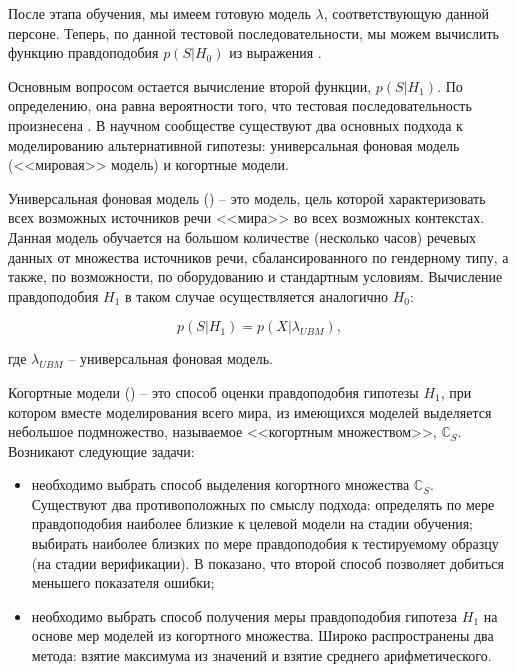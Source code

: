 После этапа обучения, мы имеем готовую модель $\lambda$, соответствующую данной персоне. Теперь, по данной тестовой последовательности, мы можем вычислить функцию правдоподобия $p(S|H_0)$ из выражения .

Основным вопросом остается вычисление второй функции, $p(S|H_1)$. По определению, она равна вероятности того, что тестовая последовательность произнесена . В научном сообществе существуют два основных подхода к моделированию альтернативной гипотезы: универсальная фоновая модель (<<мировая>> модель) и когортные модели.

\label{sec:analytic:ubm}
Универсальная фоновая модель () -- это модель, цель которой характеризовать всех возможных источников речи <<мира>> во всех возможных контекстах. Данная модель обучается на большом количестве (несколько часов) речевых данных от множества источников речи, сбалансированного по гендерному типу, а также, по возможности, по оборудованию и стандартным условиям. Вычисление правдоподобия $H_1$ в таком случае осуществляется аналогично $H_0$:

\begin{equation}
\label{eq:likelihood_ubm}
p(S|H_1) = p(X|\lambda_{UBM}),
\end{equation}

\noindent где $\lambda_{UBM}$ -- универсальная фоновая модель.

Когортные модели () -- это способ оценки правдоподобия гипотезы $H_1$, при котором вместе моделирования всего мира, из имеющихся моделей выделяется небольшое подмножество, называемое <<когортным множеством>>, $\mathbb{C}_S$. Возникают следующие задачи:
\begin{itemize}
\item необходимо выбрать способ выделения когортного множества $\mathbb{C}_S$. Существуют два противоположных по смыслу подхода: определять по мере правдоподобия наиболее близкие к целевой модели на стадии обучения; выбирать наиболее близких по мере правдоподобия к тестируемому образцу (на стадии верификации). В \cite{Kinnunen04cohort} показано, что второй способ позволяет добиться меньшего показателя ошибки;
\item необходимо выбрать способ получения меры правдоподобия гипотеза $H_1$ на основе мер моделей из когортного множества. Широко распространены два метода: взятие максимума из значений и взятие среднего арифметического.
\end{itemize}

